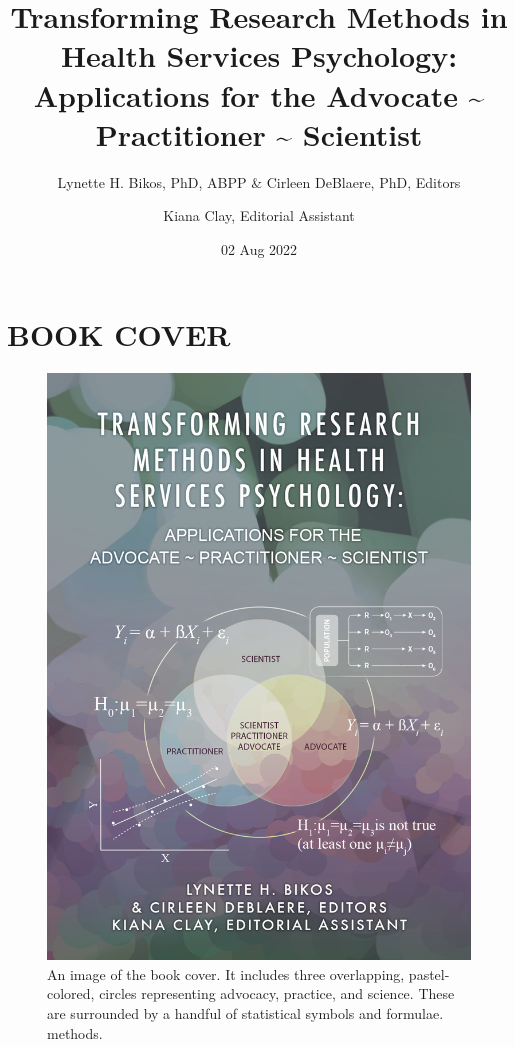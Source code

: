 \documentclass[
  11pt,
]{book}
\title{Transforming Research Methods in Health Services Psychology: Applications for the Advocate \textasciitilde{} Practitioner \textasciitilde{} Scientist}
\author{Lynette H. Bikos, PhD, ABPP \& Cirleen DeBlaere, PhD, Editors \and Kiana Clay, Editorial Assistant}
\date{02 Aug 2022}
\begin{document}
\maketitle

{
\hypersetup{linkcolor=}
\setcounter{tocdepth}{3}
\tableofcontents
}
\hypertarget{book-cover}{%
\chapter*{BOOK COVER}\label{book-cover}}

\begin{figure}
\centering
\includegraphics{images/bookcover.png}
\caption{An image of the book cover. It includes three overlapping, pastel-colored, circles representing advocacy, practice, and science. These are surrounded by a handful of statistical symbols and formulae. methods.}
\end{figure}
\end{document}

